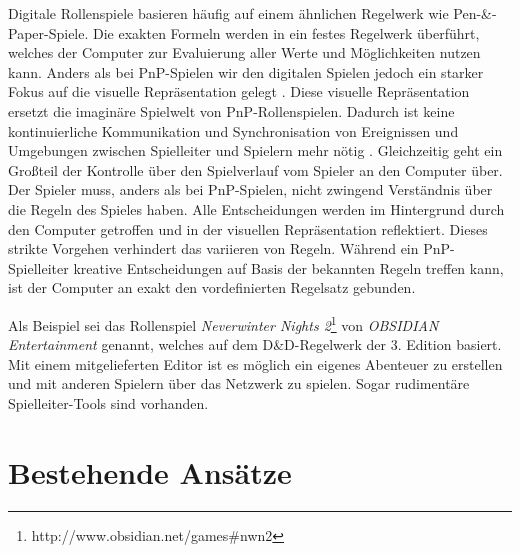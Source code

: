 Digitale Rollenspiele basieren häufig auf einem ähnlichen Regelwerk wie Pen-\&-Paper-Spiele. Die exakten Formeln werden in ein festes Regelwerk überführt, welches der Computer zur Evaluierung aller Werte und Möglichkeiten nutzen kann. Anders als bei PnP-Spielen wir den digitalen Spielen jedoch ein starker Fokus auf die visuelle Repräsentation gelegt \cite{Tychsen2006}. Diese visuelle Repräsentation ersetzt die imaginäre Spielwelt von PnP-Rollenspielen. Dadurch ist keine kontinuierliche Kommunikation und Synchronisation von Ereignissen und Umgebungen zwischen Spielleiter und Spielern mehr nötig \cite{Drachen2008}. Gleichzeitig geht ein Großteil der Kontrolle über den Spielverlauf vom Spieler an den Computer über. Der Spieler muss, anders als bei PnP-Spielen, nicht zwingend Verständnis über die Regeln des Spieles haben. Alle Entscheidungen werden im Hintergrund durch den Computer getroffen und in der visuellen Repräsentation reflektiert. Dieses strikte Vorgehen verhindert das variieren von Regeln. Während ein PnP-Spielleiter kreative Entscheidungen auf Basis der bekannten Regeln treffen kann, ist der Computer an exakt den vordefinierten Regelsatz gebunden. \cite{Drachen2008}

\addtocounter{footnote}{1}
\addtocounter{footnote}{1}

Als Beispiel sei das Rollenspiel \emph{Neverwinter Nights 2}\footnote{http://www.obsidian.net/games\#nwn2} von \emph{OBSIDIAN Entertainment} genannt, welches auf dem D\&D-Regelwerk der 3. Edition basiert. Mit einem mitgelieferten Editor ist es möglich ein eigenes Abenteuer zu erstellen und mit anderen Spielern über das Netzwerk zu spielen. Sogar rudimentäre Spielleiter-Tools sind vorhanden.~\cite{Tychsen2006a}



\section{Bestehende Ansätze}
\label{sec:BekannteAnsaetze}

